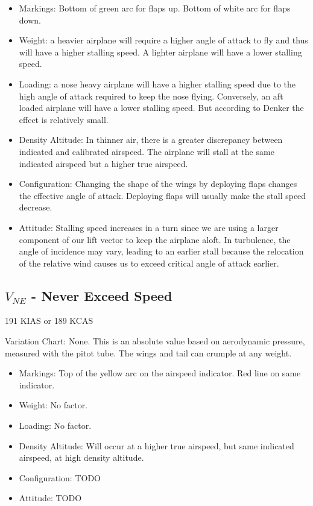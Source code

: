 \begin{itemize}
\item Markings: Bottom of green arc for flaps up. Bottom of white arc for flaps down.
\item Weight: a heavier airplane will require a higher angle of attack to fly and thus will have a higher stalling speed. A lighter airplane will have a lower stalling speed.
\item Loading: a nose heavy airplane will have a higher stalling speed due to the high angle of attack required to keep the nose flying. Conversely, an aft loaded airplane will have a lower stalling speed. But according to Denker the effect is relatively small.
\item Density Altitude: In thinner air, there is a greater discrepancy between indicated and calibrated airspeed. The airplane will stall at the same indicated airspeed but a higher true airspeed.  
\item Configuration: Changing the shape of the wings by deploying flaps changes the effective angle of attack. Deploying flaps will usually make the stall speed decrease.
\item Attitude: Stalling speed increases in a turn since we are using a larger component of our lift vector to keep the airplane aloft. In turbulence, the angle of incidence may vary, leading to an earlier stall because the relocation of the relative wind causes us to exceed critical angle of attack earlier. 
\end{itemize}


\subsection{$V_{NE}$ - Never Exceed Speed}

191 KIAS or 189 KCAS

Variation Chart: None. This is an absolute value based on aerodynamic pressure, measured with the pitot tube. The wings and tail can crumple at any weight.

\begin{itemize}
\item Markings: Top of the yellow arc on the airspeed indicator. Red line on same indicator.
\item Weight: No factor.
\item Loading: No factor.
\item Density Altitude: Will occur at a higher true airspeed, but same indicated airspeed, at high density altitude.
\item Configuration: TODO
\item Attitude: TODO
\end{itemize}

